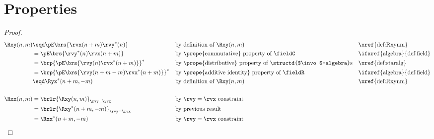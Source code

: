 \section{Properties}
\begin{theorem}
\label{thm:Rxxnm}
\label{thm:Ryynm}
\label{thm:Rxynm}
\end{theorem}
\begin{proof}
\begin{align*}
  \Rxy(n,m)
     &\eqd \pE\brs{\rvx(n+m) \rvy^\ast(n)}
     && \text{by definition of $\Rxy(n,m)$}
     && \text{\xref{def:Rxynm}}
   \\&= \pE\brs{\rvy^\ast(n) \rvx(n+m)}
     && \text{by \prope{commutative} property of $\fieldC$}
     && \text{\ifxref{algebra}{def:field}}
   \\&= \brp{\pE\brs{\rvy(n) \rvx^\ast(n+m)}}^\ast
     && \text{by \prope{distributive} property of \structd{$\invo$-algebra}s}
     && \text{\xref{def:staralg}}
   \\&= \brp{\pE\brs{\rvy(n+m-m) \rvx^\ast(n+m)}}^\ast
     && \text{by \prope{additive identity} property of $\fieldR$}
     && \text{\ifxref{algebra}{def:field}}
   \\&\eqd \Ryx^\ast(n+m,-m)
     && \text{by definition of $\Rxy(n,m)$}
     && \text{\xref{def:Rxynm}}
   \\
   \\
   \Rxx(n,m)
     &= \brlr{\Rxy(n,m)}_{\rvy=\rvx}
     && \text{by $\rvy=\rvx$ constraint}
   \\&= \brlr{\Rxy^\ast(n+m,-m)}_{\rvy=\rvx}
     && \text{by previous result}
   \\&= \Rxx^\ast(n+m,-m)
     && \text{by $\rvy=\rvx$ constraint}
\end{align*}
\end{proof}


